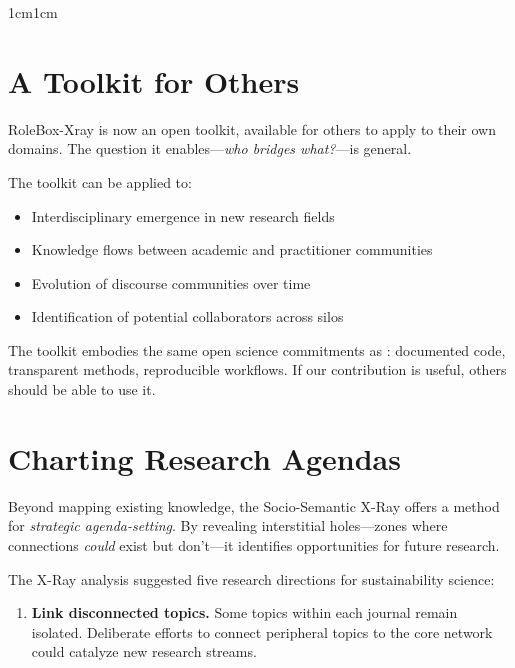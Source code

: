 \documentclass[../main.tex]{subfiles}
\begin{document}
\begin{adjustwidth}{1cm}{1cm}
\vspace{0.8cm}

\section*{A Toolkit for Others}

RoleBox-Xray is now an open toolkit, available for others to apply to their own domains. The question it enables---\textit{who bridges what?}---is general.

The toolkit can be applied to:
\begin{itemize}[leftmargin=2em]
    \item Interdisciplinary emergence in new research fields
    \item Knowledge flows between academic and practitioner communities
    \item Evolution of discourse communities over time
    \item Identification of potential collaborators across silos
\end{itemize}

The toolkit embodies the same open science commitments as \RoleBox: documented code, transparent methods, reproducible workflows. If our contribution is useful, others should be able to use it.

\vspace{0.8cm}

\section*{Charting Research Agendas}

Beyond mapping existing knowledge, the Socio-Semantic X-Ray offers a method for \textit{strategic agenda-setting}. By revealing interstitial holes---zones where connections \textit{could} exist but don't---it identifies opportunities for future research.


The X-Ray analysis suggested five research directions for sustainability science:

\begin{enumerate}[leftmargin=2em, itemsep=0.2em]
    \item \textbf{Link disconnected topics.} Some topics within each journal remain isolated. Deliberate efforts to connect peripheral topics to the core network could catalyze new research streams.


\end{enumerate}
\end{adjustwidth}
\end{document}
